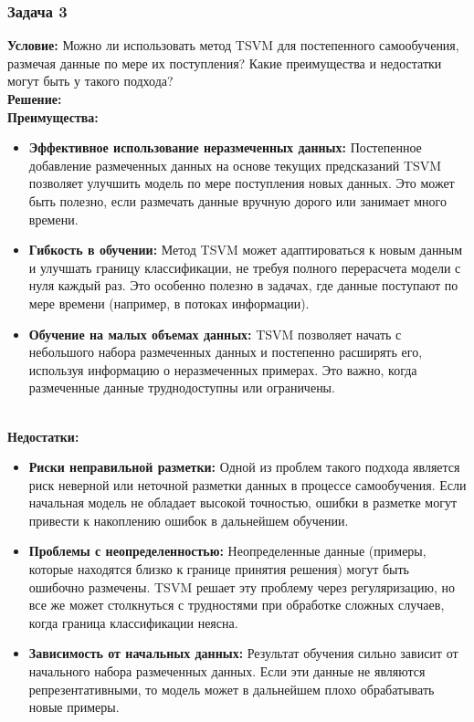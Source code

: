 \begin{itemize}
\subsubsection*{Задача 3}
\textbf{Условие:}
Можно ли использовать метод TSVM для постепенного самообучения, размечая данные по мере их поступления? Какие преимущества и недостатки могут быть у такого подхода?\\
\textbf{Решение:}\\
\textbf{Преимущества:}
\begin{itemize}
    \item \textbf{Эффективное использование неразмеченных данных:} Постепенное добавление размеченных данных на основе текущих предсказаний TSVM позволяет улучшить модель по мере поступления новых данных. Это может быть полезно, если размечать данные вручную дорого или занимает много времени.
    \item \textbf{Гибкость в обучении:} Метод TSVM может адаптироваться к новым данным и улучшать границу классификации, не требуя полного перерасчета модели с нуля каждый раз. Это особенно полезно в задачах, где данные поступают по мере времени (например, в потоках информации).
    \item \textbf{Обучение на малых объемах данных:} TSVM позволяет начать с небольшого набора размеченных данных и постепенно расширять его, используя информацию о неразмеченных примерах. Это важно, когда размеченные данные труднодоступны или ограничены.
\end{itemize}\\
\textbf{Недостатки:}
\begin{itemize}
    \item \textbf{Риски неправильной разметки:} Одной из проблем такого подхода является риск неверной или неточной разметки данных в процессе самообучения. Если начальная модель не обладает высокой точностью, ошибки в разметке могут привести к накоплению ошибок в дальнейшем обучении.
    \item \textbf{Проблемы с неопределенностью:} Неопределенные данные (примеры, которые находятся близко к границе принятия решения) могут быть ошибочно размечены. TSVM решает эту проблему через регуляризацию, но все же может столкнуться с трудностями при обработке сложных случаев, когда граница классификации неясна.
    \item \textbf{Зависимость от начальных данных:} Результат обучения сильно зависит от начального набора размеченных данных. Если эти данные не являются репрезентативными, то модель может в дальнейшем плохо обрабатывать новые примеры.
\end{itemize}


\end{itemize}
